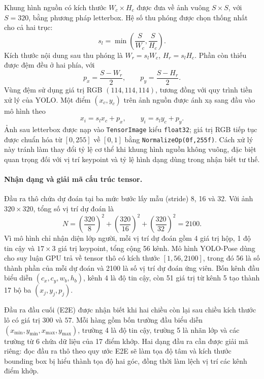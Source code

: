 Khung hình nguồn có kích thước $W_c\times H_c$ được đưa về ảnh vuông $S\times S$, với $S=320$, bằng phương pháp letterbox. Hệ số thu phóng được chọn thống nhất cho cả hai trục:
\begin{equation}
s_l=\min\!\left(\frac{S}{W_c},\frac{S}{H_c}\right).
\end{equation}
Kích thước nội dung sau thu phóng là $W_r=s_lW_c$, $H_r=s_lH_c$. Phần còn thiếu được đệm đều ở hai phía, với
\begin{equation}
p_x=\frac{S-W_r}{2},\qquad p_y=\frac{S-H_r}{2}.
\end{equation}
Vùng đệm sử dụng giá trị RGB $(114,114,114)$, tương đồng với quy trình tiền xử lý của YOLO. Một điểm $(x_c,y_c)$ trên ảnh nguồn được ánh xạ sang đầu vào mô hình theo
\begin{equation}
x_i=s_lx_c+p_x,\qquad y_i=s_ly_c+p_y.
\end{equation}
Ảnh sau letterbox được nạp vào \texttt{TensorImage} kiểu \texttt{float32}; giá trị RGB tiếp tục được chuẩn hóa từ $[0,255]$ về $[0,1]$ bằng \texttt{NormalizeOp(0f,255f)}. Cách xử lý này tránh làm thay đổi tỷ lệ cơ thể khi khung hình nguồn không vuông, đặc biệt quan trọng đối với vị trí keypoint và tỷ lệ hình dạng dùng trong nhận biết tư thế.

\paragraph{Nhận dạng và giải mã cấu trúc tensor.}
Đầu ra thô chứa dự đoán tại ba mức bước lấy mẫu (stride) 8, 16 và 32. Với ảnh $320\times320$, tổng số vị trí dự đoán là
\begin{equation}
N=\left(\frac{320}{8}\right)^2+
  \left(\frac{320}{16}\right)^2+
  \left(\frac{320}{32}\right)^2=2100.
\end{equation}
Vì mô hình chỉ nhận diện lớp người, mỗi vị trí dự đoán gồm 4 giá trị hộp, 1 độ tin cậy và $17\times3$ giá trị keypoint, tổng cộng 56 kênh. Mô hình YOLO-Pose dùng cho suy luận GPU trả về tensor thô có kích thước \([1,56,2100]\), trong đó 56 là số thành phần của mỗi dự đoán và 2100 là số vị trí dự đoán ứng viên. Bốn kênh đầu biểu diễn $(c_x,c_y,w_b,h_b)$, kênh 4 là độ tin cậy, còn 51 giá trị từ kênh 5 tạo thành 17 bộ ba $(x_j,y_j,p_j)$.

Đầu ra đầu cuối (E2E) được nhận biết khi hai chiều còn lại sau chiều kích thước lô có giá trị $300$ và $57$. Mỗi hàng gồm bốn trường đầu biểu diễn $(x_{\min},y_{\min},x_{\max},y_{\max})$, trường 4 là độ tin cậy, trường 5 là nhãn lớp và các trường từ 6 chứa dữ liệu của 17 điểm khớp. Hai dạng đầu ra cần được giải mã riêng: đọc đầu ra thô theo quy ước E2E sẽ làm tọa độ tâm và kích thước bounding box bị hiểu thành tọa độ hai góc, đồng thời làm lệch vị trí các kênh điểm khớp.


